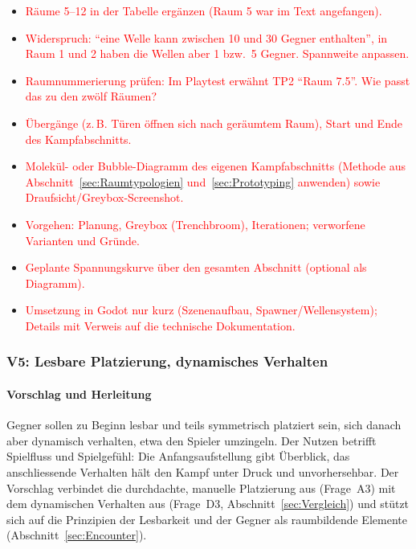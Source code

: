 \documentclass[../Main.tex]{subfiles}
\begin{document}
\begin{itemize}[leftmargin=1.5cm]
    \item \textcolor{red}{Räume 5--12 in der Tabelle ergänzen (Raum 5 war im Text angefangen).}
    \item \textcolor{red}{Widerspruch: \enquote{eine Welle kann zwischen 10 und 30 Gegner enthalten}, in Raum 1 und 2 haben die Wellen aber 1 bzw.\ 5 Gegner. Spannweite anpassen.}
    \item \textcolor{red}{Raumnummerierung prüfen: Im Playtest erwähnt TP2 \enquote{Raum 7.5}. Wie passt das zu den zwölf Räumen?}
    \item \textcolor{red}{Übergänge (z.\,B. Türen öffnen sich nach geräumtem Raum), Start und Ende des Kampfabschnitts.}
    \item \textcolor{red}{Molekül- oder Bubble-Diagramm des eigenen Kampfabschnitts (Methode aus Abschnitt~\ref{sec:Raumtypologien} und~\ref{sec:Prototyping} anwenden) sowie Draufsicht/Greybox-Screenshot.}
    \item \textcolor{red}{Vorgehen: Planung, Greybox (Trenchbroom), Iterationen; verworfene Varianten und Gründe.}
    \item \textcolor{red}{Geplante Spannungskurve über den gesamten Abschnitt (optional als Diagramm).}
    \item \textcolor{red}{Umsetzung in Godot nur kurz (Szenenaufbau, Spawner/Wellensystem); Details mit Verweis auf die technische Dokumentation.}
\end{itemize}

\subsubsection{V5: Lesbare Platzierung, dynamisches Verhalten} \label{sec:V5}

\paragraph{Vorschlag und Herleitung}
Gegner sollen zu Beginn lesbar und teils symmetrisch platziert sein, sich danach aber dynamisch verhalten, etwa den Spieler umzingeln. Der Nutzen betrifft Spielfluss und Spielgefühl: Die Anfangsaufstellung gibt Überblick, das anschliessende Verhalten hält den Kampf unter Druck und unvorhersehbar. Der Vorschlag verbindet die durchdachte, manuelle Platzierung aus  (Frage~A3) mit dem dynamischen Verhalten aus  (Frage~D3, Abschnitt~\ref{sec:Vergleich}) und stützt sich auf die Prinzipien der Lesbarkeit und der Gegner als raumbildende Elemente (Abschnitt~\ref{sec:Encounter}).
\end{document}
